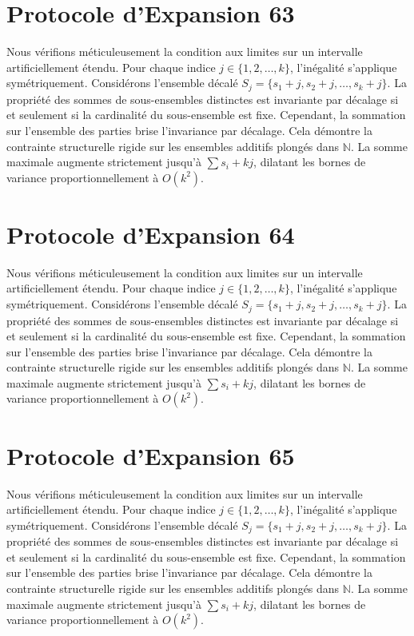 \documentclass[12pt, a4paper, french]{article}
\theoremstyle{definition}
\begin{document}
\section{Protocole d'Expansion 63}
Nous vérifions méticuleusement la condition aux limites sur un intervalle artificiellement étendu. Pour chaque indice $j \in \{1, 2, \dots, k\}$, l'inégalité s'applique symétriquement. Considérons l'ensemble décalé $S_j = \{s_1 + j, s_2 + j, \dots, s_k + j\}$. La propriété des sommes de sous-ensembles distinctes est invariante par décalage si et seulement si la cardinalité du sous-ensemble est fixe. Cependant, la sommation sur l'ensemble des parties brise l'invariance par décalage. Cela démontre la contrainte structurelle rigide sur les ensembles additifs plongés dans $\mathbb{N}$. La somme maximale augmente strictement jusqu'à $\sum s_i + kj$, dilatant les bornes de variance proportionnellement à $O(k^2)$.

\section{Protocole d'Expansion 64}
Nous vérifions méticuleusement la condition aux limites sur un intervalle artificiellement étendu. Pour chaque indice $j \in \{1, 2, \dots, k\}$, l'inégalité s'applique symétriquement. Considérons l'ensemble décalé $S_j = \{s_1 + j, s_2 + j, \dots, s_k + j\}$. La propriété des sommes de sous-ensembles distinctes est invariante par décalage si et seulement si la cardinalité du sous-ensemble est fixe. Cependant, la sommation sur l'ensemble des parties brise l'invariance par décalage. Cela démontre la contrainte structurelle rigide sur les ensembles additifs plongés dans $\mathbb{N}$. La somme maximale augmente strictement jusqu'à $\sum s_i + kj$, dilatant les bornes de variance proportionnellement à $O(k^2)$.

\section{Protocole d'Expansion 65}
Nous vérifions méticuleusement la condition aux limites sur un intervalle artificiellement étendu. Pour chaque indice $j \in \{1, 2, \dots, k\}$, l'inégalité s'applique symétriquement. Considérons l'ensemble décalé $S_j = \{s_1 + j, s_2 + j, \dots, s_k + j\}$. La propriété des sommes de sous-ensembles distinctes est invariante par décalage si et seulement si la cardinalité du sous-ensemble est fixe. Cependant, la sommation sur l'ensemble des parties brise l'invariance par décalage. Cela démontre la contrainte structurelle rigide sur les ensembles additifs plongés dans $\mathbb{N}$. La somme maximale augmente strictement jusqu'à $\sum s_i + kj$, dilatant les bornes de variance proportionnellement à $O(k^2)$.
\end{document}
